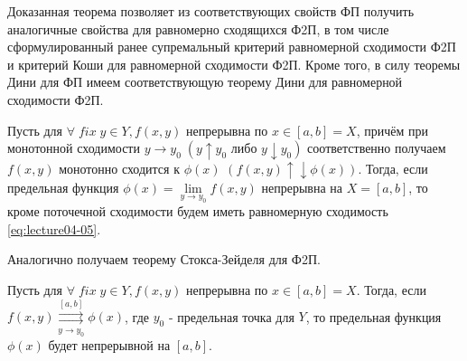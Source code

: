 \begin{notes}
	\item Доказанная теорема позволяет из соответствующих свойств ФП получить аналогичные свойства для равномерно сходящихся Ф2П, в том числе сформулированный ранее супремальный критерий равномерной сходимости Ф2П и критерий Коши для равномерной сходимости Ф2П. Кроме того, в силу теоремы Дини	для ФП имеем соответствующую теорему Дини для равномерной сходимости Ф2П.

	\begin{theorem}
		Пусть для $\forall \; fix \; y \in Y, f(x,y)$ непрерывна по $x \in [a,b] = X$, причём при монотонной сходимости \newline $y \to y_0 \; (y \uparrow y_0 \text{ либо } y \downarrow y_0)$ соответственно получаем	$f(x,y)$ монотонно сходится к $\phi(x)$ $\left(f(x,y) \uparrow \downarrow \phi(x)\right)$. Тогда, если предельная функция $\phi(x) = \lim\limits_{y \to y_0} f(x,y)$ непрерывна на $X = [a,b]$, то кроме поточечной сходимости будем иметь равномерную сходимость \eqref{eq:lecture04-05}.
	\end{theorem}
	\item 	Аналогично получаем теорему	Стокса-Зейделя для Ф2П.

	\begin{theorem}
		Пусть для $\forall \; fix \; y \in Y, f(x,y)$ непрерывна по $x \in [a,b] = X$.
		Тогда, если $ f(x,y) \overset{[a,b]}{\underset{y \to y_0}{\rightrightarrows}}  \phi(x)$, где $y_0$ - предельная точка для $Y$, то предельная функция $\phi(x)$ будет непрерывной на $[a,b]$.
	\end{theorem}
\end{notes}

